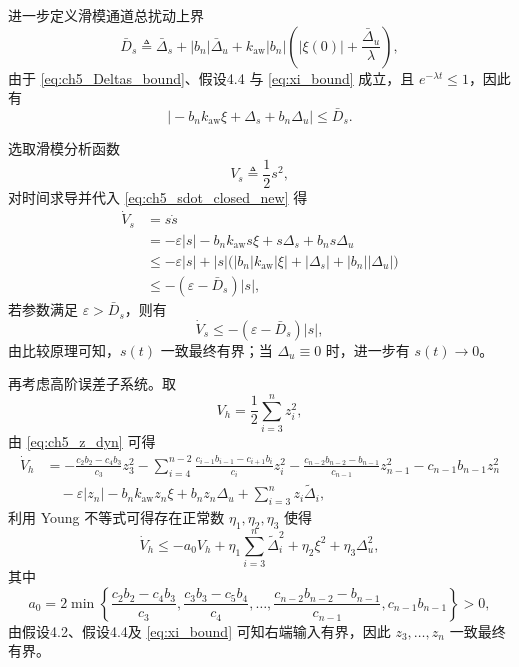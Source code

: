 进一步定义滑模通道总扰动上界
\begin{equation}\label{eq:Ds_bound}
  \bar D_s \triangleq \bar\Delta_s + |b_n|\bar\Delta_u + k_{\mathrm{aw}}|b_n|\left(|\xi(0)|+\frac{\bar\Delta_u}{\lambda}\right),
\end{equation}
由于 \eqref{eq:ch5_Deltas_bound}、假设4.4 与 \eqref{eq:xi_bound} 成立，且 $e^{-\lambda t}\le 1$，因此有
\begin{equation}\label{eq:ch5_dist_bound}
  \big|-b_nk_{\mathrm{aw}}\xi+\Delta_s+b_n\Delta_u\big|\le \bar D_s.
\end{equation}

选取滑模分析函数
\begin{equation}\label{eq:ch5_V_new}
  V_s \triangleq \frac12 s^2,
\end{equation}
对时间求导并代入 \eqref{eq:ch5_sdot_closed_new} 得
\begin{equation}\label{eq:ch5_Vdot_expand_new}
\begin{aligned}
  \dot V_s
  &= s\dot s\\
  &= -\varepsilon|s| - b_nk_{\mathrm{aw}}s\xi + s\Delta_s + b_n s\Delta_u\\
  &\le -\varepsilon|s| + |s|\big(|b_n|k_{\mathrm{aw}}|\xi| + |\Delta_s| + |b_n||\Delta_u|\big)\\
  &\le -(\varepsilon-\bar D_s)|s|,
\end{aligned}
\end{equation}
若参数满足 $\varepsilon>\bar D_s$，则有
\begin{equation}\label{eq:Vdot_final}
  \dot V_s \le -(\varepsilon-\bar D_s)|s|,
\end{equation}
由比较原理可知，$s(t)$ 一致最终有界；当 $\Delta_u\equiv 0$ 时，进一步有 $s(t)\to 0$。

再考虑高阶误差子系统。取
\begin{equation}\label{eq:ch5_Vh}
  V_h=\frac12\sum_{i=3}^{n}z_i^2,
\end{equation}
由 \eqref{eq:ch5_z_dyn} 可得
\begin{equation}\label{eq:ch5_Vhdot}
\begin{aligned}
  \dot V_h
  &= -\frac{c_2b_2-c_4b_3}{c_3}z_3^2
     -\sum_{i=4}^{n-2}\frac{c_{i-1}b_{i-1}-c_{i+1}b_i}{c_i}z_i^2
     -\frac{c_{n-2}b_{n-2}-b_{n-1}}{c_{n-1}}z_{n-1}^2
     -c_{n-1}b_{n-1}z_n^2 \\
  &\quad -\varepsilon|z_n|
     -b_nk_{\mathrm{aw}}z_n\xi
     +b_nz_n\Delta_u
     +\sum_{i=3}^{n}z_i\tilde\Delta_i,
\end{aligned}
\end{equation}
利用 Young 不等式可得存在正常数 $\eta_1,\eta_2,\eta_3$ 使得
\begin{equation}\label{eq:ch5_Vh_bound}
  \dot V_h
  \le -a_0V_h+\eta_1\sum_{i=3}^{n}\tilde\Delta_i^2+\eta_2\xi^2+\eta_3\Delta_u^2,
\end{equation}
其中
\begin{equation}
a_0=2\min\left\{\frac{c_2b_2-c_4b_3}{c_3},\frac{c_3b_3-c_5b_4}{c_4},\ldots,\frac{c_{n-2}b_{n-2}-b_{n-1}}{c_{n-1}},c_{n-1}b_{n-1}\right\}>0,
\end{equation}
由假设4.2、假设4.4及 \eqref{eq:xi_bound} 可知右端输入有界，因此 $z_3,\ldots,z_n$ 一致最终有界。

